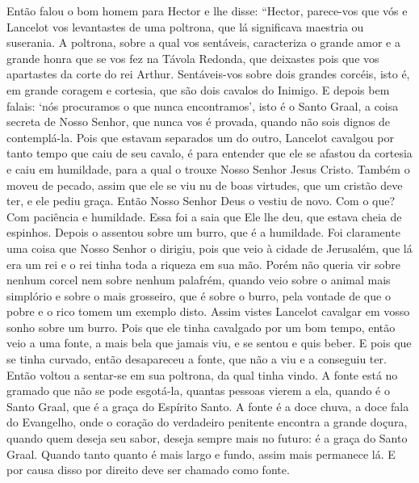 Então falou o bom homem para Hector e lhe disse: “Hector, parece-vos que vós e
Lancelot vos levantastes de uma poltrona, que lá significava maestria ou
suserania. A poltrona, sobre a qual vos sentáveis, caracteriza o grande amor e
a grande honra que se vos fez na Távola Redonda, que deixastes pois que vos
apartastes da corte do rei Arthur. Sentáveis-vos sobre dois grandes corcéis,
isto é, em grande coragem e cortesia, que são dois cavalos do Inimigo. E depois
bem falais: ‘nós procuramos o que nunca encontramos’, isto é o Santo Graal, a
coisa secreta de Nosso Senhor, que nunca vos é provada, quando não sois dignos
de contemplá-la. Pois que estavam separados um do outro, Lancelot cavalgou por
tanto tempo que caiu de seu cavalo, é para entender que ele se afastou da
cortesia e caiu em humildade, para a qual o trouxe Nosso Senhor Jesus Cristo.
Também o moveu de pecado, assim que ele se viu nu de boas virtudes, que um
cristão deve ter, e ele pediu graça. Então Nosso Senhor Deus o vestiu
de novo. Com o que? Com paciência e humildade. Essa foi a saia que Ele lhe deu,
que estava cheia de espinhos. Depois o assentou sobre um burro, que é a
humildade. Foi claramente uma coisa que Nosso Senhor o dirigiu, pois que veio à
cidade de Jerusalém, que lá era um rei e o rei tinha toda a riqueza em sua mão.
Porém não queria vir sobre nenhum corcel nem sobre nenhum palafrém, quando veio
sobre o animal mais simplório e sobre o mais grosseiro, que é sobre o burro,
pela vontade de que o pobre e o rico tomem um exemplo disto. Assim vistes
Lancelot cavalgar em vosso sonho sobre um burro. Pois que ele tinha cavalgado
por um bom tempo, então veio a uma fonte, a mais bela que jamais viu, e se
sentou e quis beber. E pois que se tinha curvado, então desapareceu a fonte,
que não a viu e a conseguiu ter. Então voltou a sentar-se em sua poltrona, da
qual tinha vindo. A fonte está no gramado que não se pode esgotá-la, quantas
pessoas vierem a ela, quando é o Santo Graal,  que é a graça do Espírito Santo.
A fonte é a doce chuva, a doce fala do Evangelho, onde o coração do verdadeiro
penitente encontra a grande doçura, quando quem deseja seu sabor, deseja sempre
mais no futuro: é a graça do Santo Graal. Quando tanto quanto é mais largo e
fundo, assim mais permanece lá. E por causa disso por direito deve ser chamado
como fonte.  

